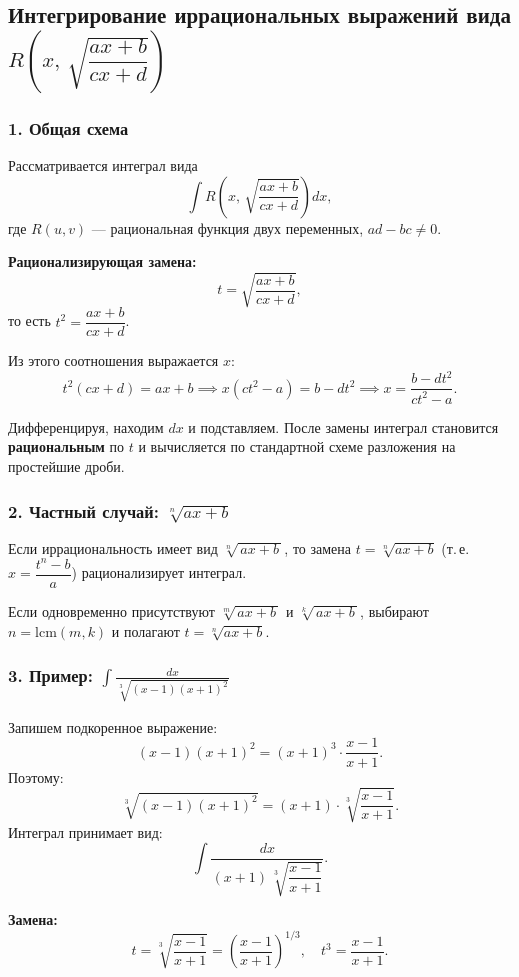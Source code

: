 \subsection{Интегрирование иррациональных выражений вида $R\!\left(x,\,\sqrt{\dfrac{ax+b}{cx+d}}\right)$}

\subsubsection*{1. Общая схема}

Рассматривается интеграл вида
\[
\int R\!\left(x,\,\sqrt{\frac{ax+b}{cx+d}}\right)dx,
\]
где $R(u,v)$ — рациональная функция двух переменных, $ad - bc \neq 0$.

\textbf{Рационализирующая замена:}
\[
t = \sqrt{\frac{ax+b}{cx+d}},
\]
то есть $t^2 = \dfrac{ax+b}{cx+d}$.

Из этого соотношения выражается $x$:
\[
t^2(cx+d) = ax+b \implies x(ct^2 - a) = b - dt^2 \implies
x = \frac{b - dt^2}{ct^2 - a}.
\]

Дифференцируя, находим $dx$ и подставляем. После замены интеграл становится \textbf{рациональным} по $t$ и вычисляется по стандартной схеме разложения на простейшие дроби.

\subsubsection*{2. Частный случай: $\sqrt[n]{ax+b}$}

Если иррациональность имеет вид $\sqrt[n]{\,ax+b\,}$, то замена $t = \sqrt[n]{ax+b}$ (т.\,е. $x = \dfrac{t^n - b}{a}$) рационализирует интеграл.

Если одновременно присутствуют $\sqrt[m]{\,ax+b\,}$ и $\sqrt[k]{\,ax+b\,}$, выбирают $n = \mathrm{lcm}(m,k)$ и полагают $t = \sqrt[n]{ax+b}$.

\subsubsection*{3. Пример: $\displaystyle\int \frac{dx}{\sqrt[3]{(x-1)(x+1)^2}}$}

Запишем подкоренное выражение:
\[
(x-1)(x+1)^2 = (x+1)^3 \cdot \frac{x-1}{x+1}.
\]
Поэтому:
\[
\sqrt[3]{(x-1)(x+1)^2}
= (x+1)\cdot\sqrt[3]{\frac{x-1}{x+1}}.
\]
Интеграл принимает вид:
\[
\int \frac{dx}{(x+1)\,\sqrt[3]{\dfrac{x-1}{x+1}}}.
\]

\textbf{Замена:}
\[
t = \sqrt[3]{\frac{x-1}{x+1}} = \left(\frac{x-1}{x+1}\right)^{1/3},
\quad t^3 = \frac{x-1}{x+1}.
\]

